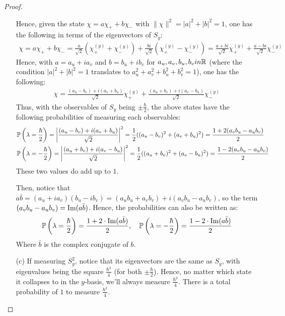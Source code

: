 \documentclass{article}
\begin{document}
\begin{proof}
\begin{itemize}
        Hence, given the state $\chi = a\chi_++b\chi_-$ with $\|\chi\|^2=|a|^2+|b|^2 = 1$, one has the following in terms of the eigenvectors of $S_y$:
        \begin{align}
            \chi = a\chi_++b\chi_- = \frac{a}{\sqrt{2}}(\chi_+^{(y)}+\chi_-^{(y)})+\frac{bi}{\sqrt{2}}(\chi_+^{(y)}-\chi_-^{(y)}) = \frac{a+bi}{\sqrt{2}}\chi_+^{(y)}+\frac{a-bi}{\sqrt{2}}\chi_-^{(y)}
        \end{align}
        Hence, with $a = a_u+ia_v$ and $b =b_u + i b_v$ for $a_u,a_v,b_u,b_v in \RR$ (where the condition $|a|^2+|b|^2=1$ translates to $a_u^2+a_v^2+b_u^2+b_v^2=1$), one has the following:
        \begin{align}
            \chi = \frac{(a_u-b_v)+i(a_v+b_u)}{\sqrt{2}}\chi_+^{(y)}+\frac{(a_u+b_v)+i(a_v-b_u)}{\sqrt{2}}\chi_-^{(y)}
        \end{align}
        Thus, with the observables of $S_y$ being $\pm\frac{\hbar}{2}$, the above states have the following probabilities of measuring each observables:
        \begin{align}
            &\PP\left(\lambda = \frac{\hbar}{2}\right) = \left|\frac{(a_u-b_v)+i(a_v+b_u)}{\sqrt{2}}\right|^2 = \frac{1}{2}((a_u-b_v)^2+(a_v+b_u)^2) = \frac{1+2(a_v b_u-a_u b_v)}{2}\\
            &\PP\left(\lambda = -\frac{\hbar}{2}\right) = \left|\frac{(a_u+b_v)+i(a_v-b_u)}{\sqrt{2}}\right|^2 = \frac{1}{2}((a_u+b_v)^2+(a_v-b_u)^2) = \frac{1-2(a_v b_u-a_u b_v)}{2}
        \end{align}
        These two values do add up to $1$.

        Then, notice that $a\bar{b} = (a_u+ia_v)(b_u-ib_v) = (a_ub_u+a_vb_v)+i(a_vb_u-a_ub_v)$, so the term $(a_vb_u-a_ub_v) = \Imag(a\bar{b})$. Hence, the probabilities can also be written as:
        \begin{align}
            \PP\left(\lambda=\frac{\hbar}{2}\right) = \frac{1+2\cdot \Imag(a\bar{b})}{2},\quad \PP\left(\lambda=-\frac{\hbar}{2}\right) = \frac{1-2\cdot \Imag(a\bar{b})}{2}
        \end{align}
        Where $\bar{b}$ is the complex conjugate of $b$.

        \hfil

        \item[(c)] If measuring $S_y^2$, notice that its eigenvectors are the same as $S_y$, with eigenvalues being the square $\frac{\hbar^2}{4}$ (for both $\pm\frac{\hbar}{2}$). Hence, no matter which state it collapses to in the $y$-basis, we'll always measure $\frac{\hbar^2}{4}$. There is a total probability of $1$ to measure $\frac{\hbar^2}{4}$.
    \end{itemize}
\end{proof}
\end{document}

